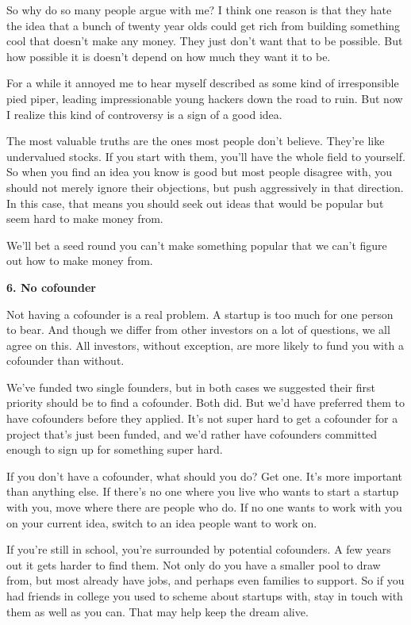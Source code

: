 So why do so many people argue with me? I think one reason is that they
hate the idea that a bunch of twenty year olds could get rich from
building something cool that doesn't make any money. They just don't
want that to be possible. But how possible it is doesn't depend on how
much they want it to be.

For a while it annoyed me to hear myself described as some kind of
irresponsible pied piper, leading impressionable young hackers down the
road to ruin. But now I realize this kind of controversy is a sign of a
good idea.

The most valuable truths are the ones most people don't believe. They're
like undervalued stocks. If you start with them, you'll have the whole
field to yourself. So when you find an idea you know is good but most
people disagree with, you should not merely ignore their objections, but
push aggressively in that direction. In this case, that means you should
seek out ideas that would be popular but seem hard to make money from.

We'll bet a seed round you can't make something popular that we can't
figure out how to make money from.

\textbf{6. No cofounder}

Not having a cofounder is a real problem. A startup is too much for one
person to bear. And though we differ from other investors on a lot of
questions, we all agree on this. All investors, without exception, are
more likely to fund you with a cofounder than without.

We've funded two single founders, but in both cases we suggested their
first priority should be to find a cofounder. Both did. But we'd have
preferred them to have cofounders before they applied. It's not super
hard to get a cofounder for a project that's just been funded, and we'd
rather have cofounders committed enough to sign up for something super
hard.

If you don't have a cofounder, what should you do? Get one. It's more
important than anything else. If there's no one where you live who wants
to start a startup with you, move where there are people who do. If no
one wants to work with you on your current idea, switch to an idea
people want to work on.

If you're still in school, you're surrounded by potential cofounders. A
few years out it gets harder to find them. Not only do you have a
smaller pool to draw from, but most already have jobs, and perhaps even
families to support. So if you had friends in college you used to scheme
about startups with, stay in touch with them as well as you can. That
may help keep the dream alive.


